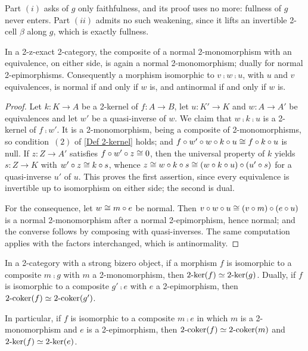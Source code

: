 \begin{remark}
  \label{Rem Faithful Enough}
  Part \((i)\) asks of \(g\) only faithfulness, and its proof uses no more: fullness of \(g\) never enters. Part \((ii)\) admits no such weakening, since it lifts an invertible 2-cell \(\beta\) along \(g\), which is exactly fullness.
\end{remark}

\begin{corollary}
  \label{C:NormalTransport}   \leanok
  In a 2-z-exact 2-category, the composite of a normal 2-monomorphism with an equivalence, on either side, is again a normal 2-monomorphism; dually for normal 2-epimorphisms. Consequently a morphism isomorphic to \(v\comp w\comp u\), with \(u\) and \(v\) equivalences, is normal if and only if \(w\) is, and antinormal if and only if \(w\) is.
\end{corollary}

\begin{proof}
  \leanok
  Let \(k\colon K\to A\) be a 2-kernel of \(f\colon A\to B\), let \(u\colon K'\to K\) and \(w\colon A\to A'\) be equivalences and let \(w'\) be a quasi-inverse of \(w\). We claim that \(w\comp k\comp u\) is a 2-kernel of \(f\comp w'\). It is a 2-monomorphism, being a composite of 2-monomorphisms, so condition~\((2)\) of \ref{Def 2-kernel} holds; and \(f\circ w'\circ w\circ k\circ u\cong f\circ k\circ u\) is null. If \(z\colon Z\to A'\) satisfies \(f\circ w'\circ z\cong 0\), then the universal property of \(k\) yields \(s\colon Z\to K\) with \(w'\circ z\cong k\circ s\), whence \(z\cong w\circ k\circ s\cong(w\circ k\circ u)\circ(u'\circ s)\) for a quasi-inverse \(u'\) of \(u\). This proves the first assertion, since every equivalence is invertible up to isomorphism on either side; the second is dual.

	For the consequence, let \(w\cong m\circ e\) be normal. Then \(v\circ w\circ u\cong(v\circ m)\circ(e\circ u)\) is a normal 2-monomorphism after a normal 2-epimorphism, hence normal; and the converse follows by composing with quasi-inverses. The same computation applies with the factors interchanged, which is antinormality.
\end{proof}

\begin{proposition}
  \label{CoKernel of Composite}   \leanok
  In a 2-category with a strong bizero object, if a morphism \(f\) is isomorphic to a composite \(m\comp g\) with \(m\) a 2-monomorphism, then \(2\text{-}\mathrm{ker}(f)\simeq2\text{-}\mathrm{ker}(g)\). Dually, if \(f\) is isomorphic to a composite \(g'\comp e\) with \(e\) a 2-epimorphism, then \(2\text{-}\mathrm{coker}(f)\simeq2\text{-}\mathrm{coker}(g')\).

	In particular, if \(f\) is isomorphic to a composite \(m\comp e\) in which \(m\) is a 2-monomorphism and \(e\) is a 2-epimorphism, then \(2\text{-}\mathrm{coker}(f)\simeq2\text{-}\mathrm{coker}(m)\) and \(2\text{-}\mathrm{ker}(f)\simeq2\text{-}\mathrm{ker}(e)\).
\end{proposition}

